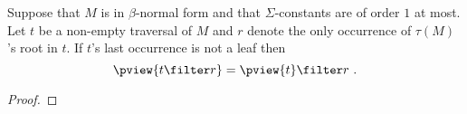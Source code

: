 \begin{lemma}
\label{lem:red_pview_trav}
Suppose that $M$ is in $\beta$-normal form and that $\Sigma$-constants are of order $1$ at most.
Let $t$ be a non-empty traversal of $M$ and $r$ denote the only occurrence of $\tau(M)$'s
root in $t$. If $t$'s last occurrence is not a leaf then
$$ \pview{t \filter  r } = \pview{t} \filter r \ .$$
\end{lemma}
\begin{proof}


\end{proof}
